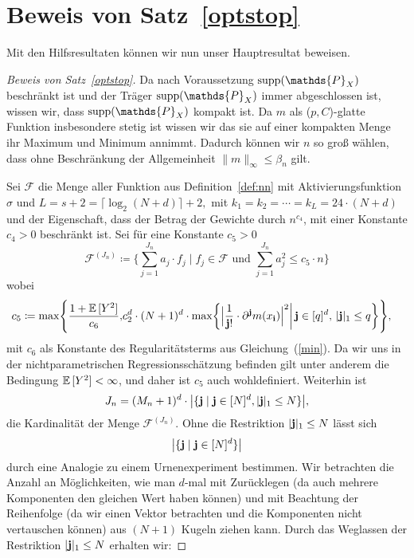 \section{Beweis von Satz~\ref{optstop}}
Mit den Hilfsresultaten können wir nun unser Hauptresultat beweisen.
\begin{proof}[Beweis von Satz~\ref{optstop}]
Da nach Voraussetzung $\supp(\mathds{P}_X)$ beschränkt ist und der Träger $\supp(\mathds{P}_X)$ immer abgeschlossen ist, wissen wir, dass $\supp(\mathds{P}_X)$ kompakt ist. Da $m$ als ($p,C$)-glatte Funktion insbesondere stetig ist wissen wir das sie auf einer kompakten Menge ihr Maximum und Minimum annimmt. Dadurch können wir $n$ so groß wählen, dass ohne Beschränkung der Allgemeinheit $\|m\|_{\infty} \leq \beta_n$ gilt.

Sei $\mathcal{F}$ die Menge aller Funktion aus Definition~\ref{def:nn} mit Aktivierungsfunktion $\sigma$ und $L = s + 2 = \lceil\log_2(N + d)\rceil + 2,$ mit $k_1 = k_2 = \cdots = k_L = 24 \cdot (N + d)$ und der Eigenschaft, dass der Betrag der Gewichte durch $n^{c_{4}}$, mit einer Konstante $c_4 > 0$ beschränkt ist. Sei  für eine Konstante $c_5 > 0$
$$ \mathcal{F}^{(J_n)} \coloneqq \biggl\{\sum_{j = 1}^{J_n} a_j \cdot f_j \mid f_j \in \mathcal{F} \text{ und } \sum_{j = 1}^{J_n} a_j^2 \leq c_5 \cdot n \biggr\}$$
wobei
\begin{equation}
\label{constantc21}
\begin{split}
c_5 \coloneqq \max\Biggl\{\frac{1 + \mathbb{E}\,[Y^2]}{c_6}, & c_2^d \cdot (N + 1)^d \cdot \max\biggl\{\Big| \frac{1}{\mathbf{j}!} \cdot \partial^{\mathbf{j}}m(x_{\mathbf{i}})\Big|^2 \bigg| \, \mathbf{j} \in [q]^d,\, |\mathbf{j}|_1 \leq q\biggr\}\Biggr\},
\end{split}
\end{equation}
mit $c_6$ als Konstante des Regularitätsterms aus Gleichung~(\ref{min}). Da wir uns in der nichtparametrischen Regressionsschätzung befinden gilt unter anderem die Bedingung $\mathbb{E}\,[Y^2] < \infty$, und daher ist $c_5$ auch wohldefiniert.
Weiterhin ist
$$J_n = (M_n + 1)^d \cdot \big|\{\mathbf{j} \mid \mathbf{j} \in [N]^d, |\mathbf{j}|_1 \leq N\}\big|,$$ 
die Kardinalität der Menge $\mathcal{F}^{(J_n)}$. 
Ohne die Restriktion $|\mathbf{j}|_1 \leq N$ lässt sich $$\big|\{\mathbf{j} \mid \mathbf{j} \in [N]^d\}\big|$$ durch eine Analogie zu  einem Urnenexperiment bestimmen. Wir betrachten die Anzahl an Möglichkeiten, wie man $d$-mal mit Zurücklegen (da auch mehrere Komponenten den gleichen Wert haben können) und mit Beachtung der Reihenfolge (da wir einen Vektor betrachten und die Komponenten nicht vertauschen können) aus $(N + 1)$ Kugeln ziehen kann. Durch das Weglassen der Restriktion $|\mathbf{j}|_1 \leq N$ erhalten wir:

\end{proof}
